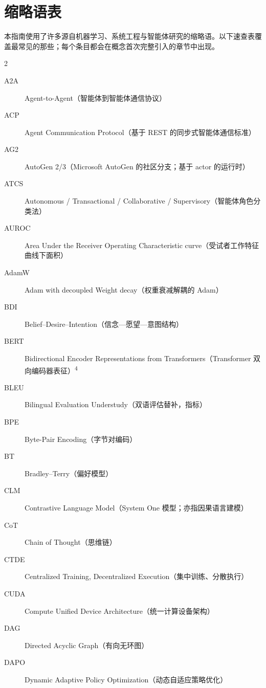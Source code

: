 \documentclass[11pt,a4paper,openany]{book}
\begin{document}
\chapter*{缩略语表}
\label{glossary}

本指南使用了许多源自机器学习、系统工程与智能体研究的缩略语。以下速查表覆盖最常见的那些；每个条目都会在概念首次完整引入的章节中出现。

\begin{multicols}{2}
\small
\begin{description}

\item[A2A] Agent-to-Agent（智能体到智能体通信协议）
\item[ACP] Agent Communication Protocol（基于 REST 的同步式智能体通信标准）
\item[AG2] AutoGen 2/3（Microsoft AutoGen 的社区分支；基于 actor 的运行时）
\item[ATCS] Autonomous / Transactional / Collaborative / Supervisory（智能体角色分类法）
\item[AUROC] Area Under the Receiver Operating Characteristic curve（受试者工作特征曲线下面积）
\item[AdamW] Adam with decoupled Weight decay（权重衰减解耦的 Adam）
\item[BDI] Belief--Desire--Intention（信念—愿望—意图结构）
\item[BERT] Bidirectional Encoder Representations from Transformers（Transformer 双向编码器表征）\textsuperscript{4}
\item[BLEU] Bilingual Evaluation Understudy（双语评估替补，指标）
\item[BPE] Byte-Pair Encoding（字节对编码）
\item[BT] Bradley--Terry（偏好模型）
\item[CLM] Contrastive Language Model（System One 模型；亦指因果语言建模）
\item[CoT] Chain of Thought（思维链）
\item[CTDE] Centralized Training, Decentralized Execution（集中训练、分散执行）
\item[CUDA] Compute Unified Device Architecture（统一计算设备架构）
\item[DAG] Directed Acyclic Graph（有向无环图）
\item[DAPO] Dynamic Adaptive Policy Optimization（动态自适应策略优化）

\end{description}
\end{multicols}
\end{document}
